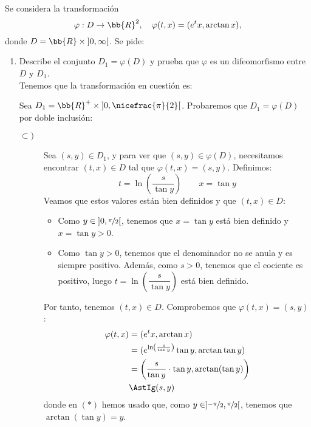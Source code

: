 \documentclass[12pt]{article}
\begin{document}
    \begin{ejercicio}
        Se considera la transformación
        \begin{equation*}
            \varphi : D \to \bb{R}^2, \quad \varphi(t, x) = (e^{t}x, \arctan x),
        \end{equation*}
        donde $D = \bb{R} \times \left]0, \infty\right[$. Se pide:
        \begin{enumerate}
            \item Describe el conjunto $D_1 = \varphi(D)$ y prueba que $\varphi$ es un difeomorfismo entre $D$ y $D_1$.\\
            
            Tenemos que la transformación en cuestión es:

            Sea $D_1=\bb{R}^+\times\left]0,\nicefrac{\pi}{2}\right[$. Probaremos que $D_1=\varphi(D)$ por doble inclusión:
            \begin{description}
                \item[$\subset)$] Sea $(s,y)\in D_1$, y para ver que $(s,y)\in\varphi(D)$, necesitamos encontrar $(t,x)\in D$ tal que $\varphi(t,x)=(s,y)$. Definimos:
                \begin{equation*}
                    t=\ln\left(\dfrac{s}{\tan y}\right)\qquad x=\tan y
                \end{equation*}
                Veamos que estos valores están bien definidos y que $(t,x)\in D$:
                \begin{itemize}
                    \item Como $y\in \left]0,\nicefrac{\pi}{2}\right[$, tenemos que $x=\tan y$ está bien definido y $x=\tan y>0$.
                    \item Como $\tan y>0$, tenemos que el denominador no se anula y es siempre positivo. Además, como $s>0$, tenemos que el cociente es positivo, luego $t=\ln\left(\dfrac{s}{\tan y}\right)$ está bien definido.
                \end{itemize}
                Por tanto, tenemos $(t,x)\in D$. Comprobemos que $\varphi(t,x)=(s,y)$:
                \begin{align*}
                    \varphi(t,x)
                    &=(e^t x,\arctan x)\\
                    &=(e^{\ln\left(\frac{s}{\tan y}\right)}\tan y,\arctan\tan y)\\
                    &=\left(\dfrac{s}{\tan y}\cdot \tan y,\arctan(\tan y)\right)\\
                    &\AstIg(s,y)
                \end{align*}
                donde en $(\ast)$ hemos usado que, como $y\in ]\nicefrac{-\pi}{2},\nicefrac{\pi}{2}[$, tenemos que $\arctan(\tan y)=y$.


\end{description}
\end{enumerate}
\end{ejercicio}
\end{document}
